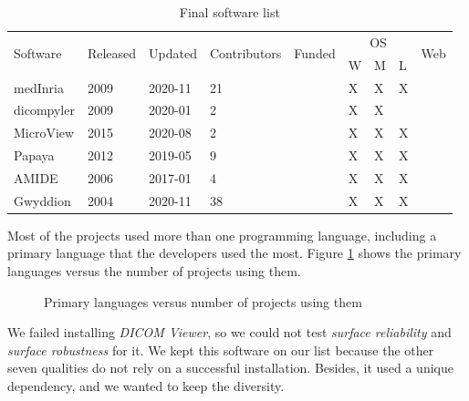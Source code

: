 \begin{table}[H]
\begin{tabular}{lllllllll}
\hline
\multirow{2}{*}{Software} & \multirow{2}{*}{Released} & \multirow{2}{*}{Updated} & \multirow{2}{*}{Contributors} & \multirow{2}{*}{Funded} & \multicolumn{3}{c}{OS} & \multirow{2}{*}{Web} \\ \cline{6-8}
 &  &  &  &  & W & M & L &  \\ \hline
medInria \cite{Fillard2012} & 2009 & 2020-11 & 21 &  & X & X & X &  \\
dicompyler \cite{Panchal2010} & 2009 & 2020-01 & 2 &  & X & X &  &  \\
MicroView \cite{ParallaxInnovations2020} & 2015 & 2020-08 & 2 &  & X & X & X &  \\
Papaya \cite{UTHSCSA2019} & 2012 & 2019-05 & 9 &  & X & X & X &  \\
AMIDE \cite{Loening2017} & 2006 & 2017-01 & 4 &  & X & X & X &  \\
Gwyddion \cite{Nevcas2012} & 2004 & 2020-11 & 38 &  & X & X & X &  \\ \hline
\end{tabular}
\caption{\label{tab_final_list}Final software list}
\end{table}

Most of the projects used more than one programming language, including a primary language that the developers used the most. Figure \ref{fig_language} shows the primary languages versus the number of projects using them.

\begin{figure}[H]
\centering
{}
\caption{\label{fig_language}Primary languages versus number of projects using them}
\end{figure}

We failed installing \textit{DICOM Viewer}, so we could not test \textit{surface reliability} and \textit{surface robustness} for it. We kept this software on our list because the other seven qualities do not rely on a successful installation. Besides, it used a unique dependency, and we wanted to keep the diversity.

